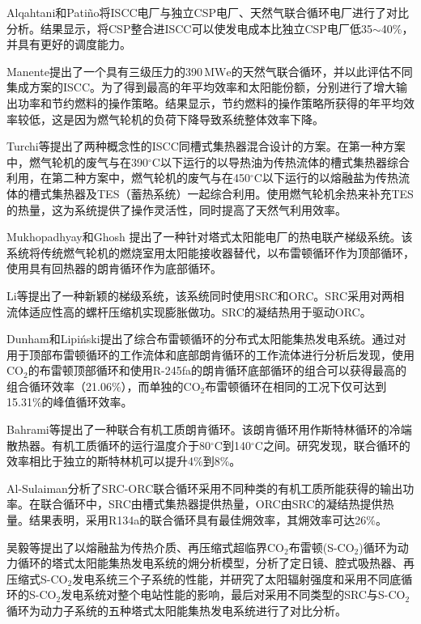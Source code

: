 Alqahtani和Pati\~{n}o\cite{Alqahtani2016}将ISCC电厂与独立CSP电厂、天然气联合循环电厂进行了对比分析。结果显示，将CSP整合进ISCC可以使发电成本比独立CSP电厂低35$\sim$40\%，并具有更好的调度能力。

Manente\cite{Manente2016}提出了一个具有三级压力的390$\,\mathrm{MWe}$的天然气联合循环，并以此评估不同集成方案的ISCC。为了得到最高的年平均效率和太阳能份额，分别进行了增大输出功率和节约燃料的操作策略。结果显示，节约燃料的操作策略所获得的年平均效率较低，这是因为燃气轮机的负荷下降导致系统整体效率下降。

Turchi等\cite{Turchi2014}提出了两种概念性的ISCC同槽式集热器混合设计的方案。在第一种方案中，燃气轮机的废气与在390$^\circ\mathrm{C}$以下运行的以导热油为传热流体的槽式集热器综合利用，在第二种方案中，燃气轮机的废气与在450$^\circ\mathrm{C}$以下运行的以熔融盐为传热流体的槽式集热器及TES（蓄热系统）一起综合利用。使用燃气轮机余热来补充TES的热量，这为系统提供了操作灵活性，同时提高了天然气利用效率。

Mukhopadhyay和Ghosh\cite{Mukhopadhyay2016}
提出了一种针对塔式太阳能电厂的热电联产梯级系统。该系统将传统燃气轮机的燃烧室用太阳能接收器替代，以布雷顿循环作为顶部循环，使用具有回热器的朗肯循环作为底部循环。

Li等\cite{Li2016a}提出了一种新颖的梯级系统，该系统同时使用SRC和ORC。SRC采用对两相流体适应性高的螺杆压缩机实现膨胀做功。SRC的凝结热用于驱动ORC。

Dunham和Lipi\'{n}ski\cite{Dunham2013}提出了综合布雷顿循环的分布式太阳能集热发电系统。通过对用于顶部布雷顿循环的工作流体和底部朗肯循环的工作流体进行分析后发现，使用CO$_2$的布雷顿顶部循环和使用R-245fa的朗肯循环底部循环的组合可以获得最高的组合循环效率（21.06\%），而单独的CO$_2$布雷顿循环在相同的工况下仅可达到15.31\%的峰值循环效率。

Bahrami等\cite{Bahrami2013}提出了一种联合有机工质朗肯循环。该朗肯循环用作斯特林循环的冷端散热器。有机工质循环的运行温度介于80$\mathrm{^\circ C}$到140$\mathrm{^\circ C}$之间。研究发现，联合循环的效率相比于独立的斯特林机可以提升4\%到8\%。

Al-Sulaiman\cite{AlSulaiman2014}分析了SRC-ORC联合循环采用不同种类的有机工质所能获得的输出功率。在联合循环中，SRC由槽式集热器提供热量，ORC由SRC的凝结热提供热量。结果表明，采用R134a的联合循环具有最佳㶲效率，其㶲效率可达26\%。

吴毅等\cite{Wu2016}提出了以熔融盐为传热介质、再压缩式超临界CO$_2$布雷顿(S-CO$_2$)循环为动力循环的塔式太阳能集热发电系统的㶲分析模型，分析了定日镜、腔式吸热器、再压缩式S-CO$_2$发电系统三个子系统的性能，并研究了太阳辐射强度和采用不同底循环的S-CO$_2$发电系统对整个电站性能的影响，最后对采用不同类型的SRC与S-CO$_2$循环为动力子系统的五种塔式太阳能集热发电系统进行了对比分析。

